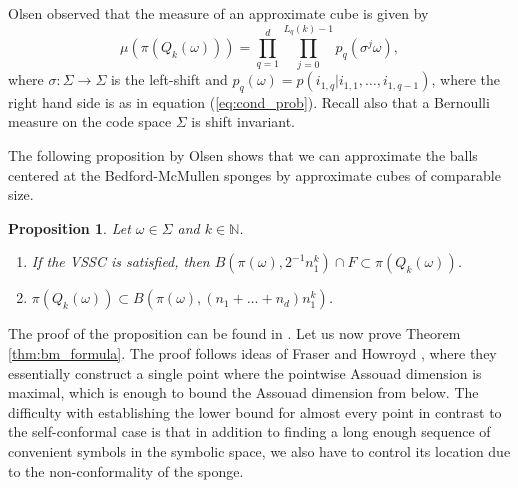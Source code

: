 \documentclass{PRM}
\newcommand{\field}[1]{\mathbb{#1}}
\newcommand{\N}{\field{N}}
\theoremstyle{plain}
\newtheorem{prop}[thm]{Proposition}
\theoremstyle{definition}
\theoremstyle{remark}
\begin{document}
Olsen \cite{O} observed that the measure of an approximate cube is given by
\begin{equation}\label{eq:appr_cube_msr}
    \mu(\pi(Q_k(\omega)))=\prod_{q=1}^d\prod_{j=0}^{L_q(k)-1}p_q(\sigma^j\omega),
\end{equation}
where $\sigma:\Sigma \to \Sigma$ is the left-shift and $p_q(\omega)=p(i_{1,q}|i_{1,1},\ldots,i_{1,q-1})$, where the right hand side is as in equation (\ref{eq:cond_prob}). Recall also that a Bernoulli measure on the code space $\Sigma$ is shift invariant.

The following proposition by Olsen shows that we can approximate the balls centered at the Bedford-McMullen sponges by approximate cubes of comparable size.

\begin{prop}\label{prop:olsenvssc}
Let $\omega\in\Sigma$ and $k\in\N$.
\begin{enumerate}
    \item If the VSSC is satisfied, then $B(\pi(\omega),2^{-1}n_1^k)\cap F\subset \pi(Q_k(\omega))$.
    \item  $\pi(Q_k(\omega))\subset B(\pi(\omega),(n_1+\ldots+n_d)n_1^k)$.
\end{enumerate}
\end{prop}
The proof of the proposition can be found in \cite[Proposition 6.2.1]{O}. Let us now prove Theorem \ref{thm:bm_formula}. The proof follows ideas of Fraser and Howroyd \cite[Theorem 2.6]{FH}, where they essentially construct a single point where the pointwise Assouad dimension is maximal, which is enough to bound the Assouad dimension from below. The difficulty with establishing the lower bound for almost every point in contrast to the self-conformal case is that in addition to finding a long enough sequence of convenient symbols in the symbolic space, we also have to control its location due to the non-conformality of the sponge.
\end{document}
